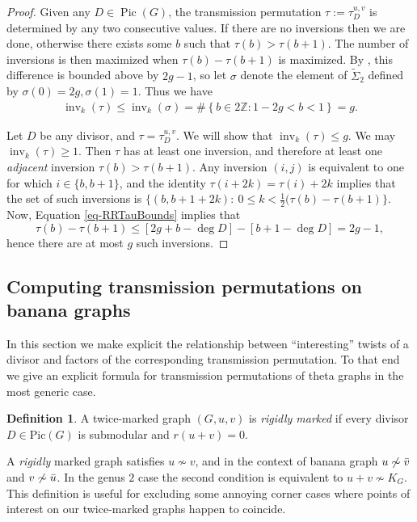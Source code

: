 \documentclass[11pt]{article}
\theoremstyle{definition}
\newtheorem{defi}[theo]{Definition}
\numberwithin{equation}{section}
\newcommand{\Z}{\mathbb{Z}}
\newcommand{\pic}[1]{\mathrm{Pic}\left({#1}\right)}
\newcommand{\inv}{\operatorname{inv}}
\newcommand{\eaf}[1]{\widetilde{\Sigma}_{#1}}
\newcommand{\set}[1]{\left\{{#1}\right\}}
\newcommand{\tauD}{\tau^{u,v}_D}
\newcommand{\Pic}{\operatorname{Pic}}
\begin{document}
\begin{proof}
    Given any $D \in \Pic(G)$, the transmission permutation $\tau:= \tauD$ is determined by any two consecutive values. If there are no inversions then we are done, otherwise there exists some $b$ such that $\tau(b)>\tau(b+1)$. The number of inversions is then maximized when $\tau(b)-\tau(b+1)$ is maximized. By , this difference is bounded above by $2g-1$, so let $\sigma$ denote the element of $\eaf{2}$ defined by $\sigma(0) = 2g,\sigma(1) = 1$. Thus we have
    \begin{align*}
        \inv_k(\tau) \leq \inv_k(\sigma) = \#\set{b \in 2\Z: 1-2g<b<1} =g.
    \end{align*}

    Let $D$ be any divisor, and $\tau = \tauD$. We will show that $\inv_k(\tau) \leq g$. We may $\inv_k(\tau) \geq 1$. Then $\tau$ has at least one inversion, and therefore at least one \emph{adjacent} inversion $\tau(b) > \tau(b+1)$. Any inversion $(i,j)$ is equivalent to one for which $i \in \{b,b+1\}$, and the identity $\tau(i+2k) = \tau(i)+2k$ implies that the set of such inversions is $\{(b,b+1+2k):\ 0 \leq k < \frac12(\tau(b) - \tau(b+1) \}$. Now, Equation \eqref{eq-RRTauBounds} implies that 
    \[ \tau(b) - \tau(b+1) \leq \left[ 2g+b - \deg D \right] - \left[ b+1 - \deg D \right] = 2g-1,\]
    hence there are at most $g$ such inversions.
\end{proof}

\subsection{Computing transmission permutations on banana graphs}
In this section we make explicit the relationship between ``interesting'' twists of a divisor and factors of the corresponding transmission permutation. To that end we give an explicit formula for transmission permutations of theta graphs in the most generic case.

\begin{defi}
    A twice-marked graph $(G,u,v)$ is \textit{rigidly marked} if every divisor $D \in \pic{G}$ is submodular and $r(u + v) = 0$.
\end{defi}

A \textit{rigidly} marked graph satisfies $u \not \sim v$, and in the context of banana graph $u \not \sim \Bar{v}$ and $v \not \sim \Bar{u}$. In the genus $2$ case the second condition is equivalent to $u+v \not \sim K_G$. This definition is useful for excluding some annoying corner cases where points of interest on our twice-marked graphs happen to coincide.
\end{document}
